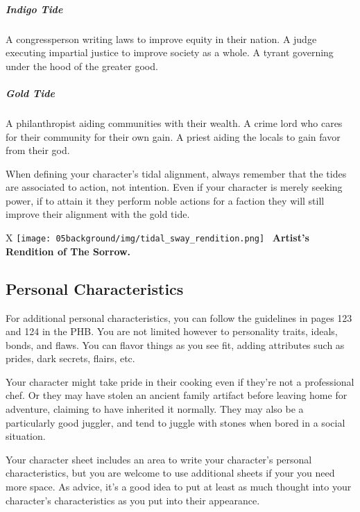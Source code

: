 \subparagraph{Indigo Tide} A congressperson writing laws to improve equity in their nation.
A judge executing impartial justice to improve society as a whole.
A tyrant governing under the hood of the greater good.

\subparagraph{Gold Tide} A philanthropist aiding communities with their wealth.
A crime lord who cares for their community for their own gain.
A priest aiding the locals to gain favor from their god.

When defining your character's tidal alignment, always remember that the tides are associated to action, not intention.
Even if your character is merely seeking power, if to attain it they perform noble actions for a faction they will still improve their alignment with the gold tide.

\begin{table*}[b]%
    \begin{DndTable}[width=\linewidth]{X}
        \centering
        \texttt{[image: 05background/img/tidal\_sway\_rendition.png]} \
        \centering \large{\textbf{Artist's Rendition of The Sorrow.}}
    \end{DndTable}
\end{table*}

\subsection*{Personal Characteristics}
For additional personal characteristics, you can follow the guidelines in pages 123 and 124 in the PHB.
You are not limited however to personality traits, ideals, bonds, and flaws.
You can flavor things as you see fit, adding attributes such as prides, dark secrets, flairs, etc.

Your character might take pride in their cooking even if they're not a professional chef.
Or they may have stolen an ancient family artifact before leaving home for adventure, claiming to have inherited it normally.
They may also be a particularly good juggler, and tend to juggle with stones when bored in a social situation.

Your character sheet includes an area to write your character's personal characteristics, but you are welcome to use additional sheets if your you need more space.
As advice, it's a good idea to put at least as much thought into your character's characteristics as you put into their appearance.
